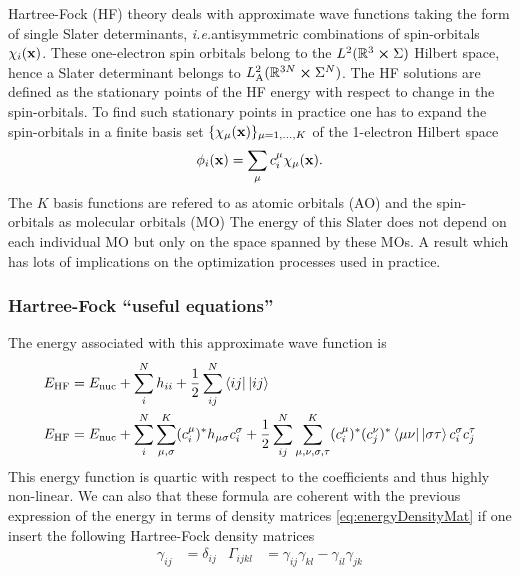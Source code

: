 \documentclass[11pt,a4paper]{article}
\newcommand{\ie}{\textit{i.e.}}
\newcommand{\HF}{\text{HF}}
\begin{document}
Hartree-Fock (HF) theory deals with approximate wave functions taking the form of single Slater determinants, \ie antisymmetric combinations of spin-orbitals $\chi_i(\vb{x})$.
These one-electron spin orbitals belong to the $L^2(\mathbb{R}^{3}\cross \Sigma)$ Hilbert space, hence a Slater determinant belongs to $L^2_{\text{A}}(\mathbb{R}^{3N}\cross \Sigma^N)$.
The HF solutions are defined as the stationary points of the HF energy with respect to change in the spin-orbitals.
To find such stationary points in practice one has to expand the spin-orbitals in a finite basis set $\{\chi_{\mu}(\vb{x})\}_{\mu=1,\dots,K}$ of the 1-electron Hilbert space
\begin{equation}
  \label{eq:HF_MO}
  \phi_i(\vb{x}) = \sum_\mu c_i^\mu \chi_{\mu}(\vb{x}).
\end{equation}
The $K$ basis functions are refered to as atomic orbitals (AO) and the spin-orbitals as molecular orbitals (MO)
The energy of this Slater does not depend on each individual MO but only on the space spanned by these MOs. A result which has lots of implications on the optimization processes used in practice.

\subsubsection{Hartree-Fock ``useful equations''}
\label{sec:formularyHF}

The energy associated with this approximate wave function is
\begin{align}
  \label{eq:HF_NRJ}
  E_{\HF} &=  E_{\text{nuc}} + \sum_i^{N}h_{ii} + \frac{1}{2}\sum_{ij}^N\bra{ij}\hspace{0.1px}\ket{ij} \\
  E_{\HF} &=  E_{\text{nuc}} + \sum_i^N \sum_{\mu,\sigma}^K (c_i^\mu)^* h_{\mu\sigma} c_i^\sigma + \frac{1}{2} \sum_{ij}^N \sum_{\mu,\nu,\sigma,\tau}^K (c_i^\mu)^*(c_j^\nu)^* \bra{\mu\nu}\hspace{0.1px}\ket{\sigma\tau} c_i^\sigma c_j^\tau 
\end{align}
This energy function is quartic with respect to the coefficients and thus highly non-linear.
We can also that these formula are coherent with the previous expression of the energy in terms of density matrices \eqref{eq:energyDensityMat}
if one insert the following Hartree-Fock density matrices
\begin{align}
  \label{eq:HF_RDM}
  \gamma_{ij}&= \delta_{ij}
  &
  \Gamma_{ijkl}&=\gamma_{ij}\gamma_{kl} - \gamma_{il}\gamma_{jk}
\end{align}
\end{document}
